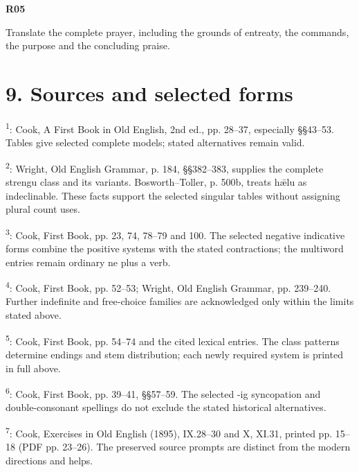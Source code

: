 \par\begin{minipage}{\linewidth}\raggedright
\textbf{R05}

Translate the complete prayer, including the grounds of entreaty, the commands, the purpose and the concluding praise.

\end{minipage}\par\addvspace{4pt}

\section*{9. Sources and selected forms}

\begingroup\fontsize{10}{12.8}\selectfont
\setlength{\parskip}{1.5pt}
\textsuperscript{1}: Cook, A First Book in Old English, 2nd ed., pp. 28–37, especially §§43–53. Tables give selected complete models; stated alternatives remain valid.

\textsuperscript{2}: Wright, Old English Grammar, p. 184, §§382–383, supplies the complete strengu class and its variants. Bosworth–Toller, p. 500b, treats hǣlu as indeclinable. These facts support the selected singular tables without assigning plural count uses.

\textsuperscript{3}: Cook, First Book, pp. 23, 74, 78–79 and 100. The selected negative indicative forms combine the positive systems with the stated contractions; the multiword entries remain ordinary ne plus a verb.

\textsuperscript{4}: Cook, First Book, pp. 52–53; Wright, Old English Grammar, pp. 239–240. Further indefinite and free-choice families are acknowledged only within the limits stated above.

\textsuperscript{5}: Cook, First Book, pp. 54–74 and the cited lexical entries. The class patterns determine endings and stem distribution; each newly required system is printed in full above.

\textsuperscript{6}: Cook, First Book, pp. 39–41, §§57–59. The selected -ig syncopation and double-consonant spellings do not exclude the stated historical alternatives.

\textsuperscript{7}: Cook, Exercises in Old English (1895), IX.28–30 and X, XI.31, printed pp. 15–18 (PDF pp. 23–26). The preserved source prompts are distinct from the modern directions and helps.

\endgroup

\par\label{end-ch15-learner}
\clearpage\endgroup
